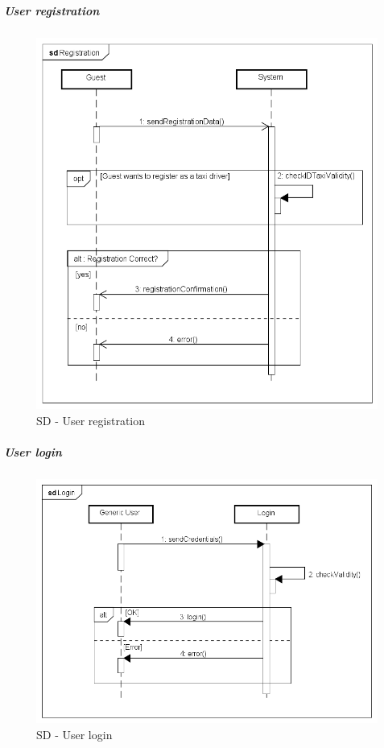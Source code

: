 \subparagraph{User registration}
\noindent
    \begin{figure}[H]
        \includegraphics[width=\textwidth]{./Diagrams/Registration.png}
        \caption{SD - User registration}
        \centering
    \end{figure}
\newpage
\subparagraph{User login}
\noindent
\begin{figure}[H]
        \includegraphics[width=\textwidth]{./Diagrams/Login.png}
        \caption{SD - User login}
        \centering
    \end{figure}
\noindent

